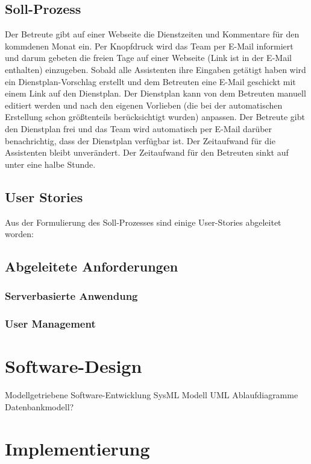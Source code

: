 \documentclass[12pt,a4paper,titlepage]{article} %
\begin{document}
\subsection{Soll-Prozess}
Der Betreute gibt auf einer Webseite die Dienstzeiten und Kommentare für den kommdenen Monat ein. Per Knopfdruck wird das Team per E-Mail informiert und darum gebeten die freien Tage auf einer Webseite (Link ist in der E-Mail enthalten) einzugeben. Sobald alle Assistenten ihre Eingaben getätigt haben wird ein Dienstplan-Vorschlag erstellt und dem Betreuten eine E-Mail geschickt mit einem Link auf den Dienstplan. Der Dienstplan kann von dem Betreuten manuell editiert werden und nach den eigenen Vorlieben (die bei der automatischen Erstellung schon größtenteils berücksichtigt wurden) anpassen. Der Betreute gibt den Dienstplan frei und das Team wird automatisch per E-Mail darüber benachrichtig, dass der Dienstplan verfügbar ist.
Der Zeitaufwand für die Assistenten bleibt unverändert. Der Zeitaufwand für den Betreuten sinkt auf unter eine halbe Stunde.

\subsection{User Stories}
Aus der Formulierung des Soll-Prozesses sind einige User-Stories abgeleitet worden:


\subsection{Abgeleitete Anforderungen}
\subsubsection{Serverbasierte Anwendung}
\subsubsection{User Management}


\section{Software-Design} %
Modellgetriebene Software-Entwicklung
SysML Modell
UML Ablaufdiagramme
Datenbankmodell?

\section{Implementierung}
\end{document}
